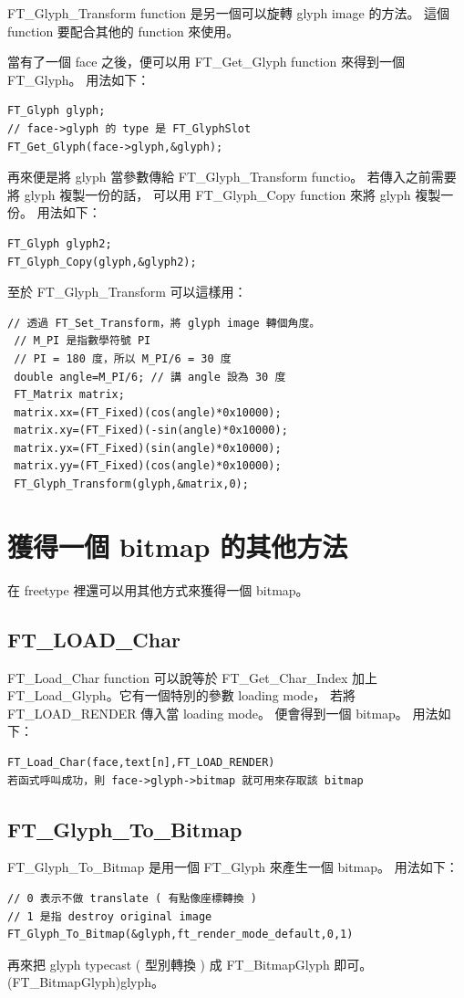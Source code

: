 \documentclass[12pt,a4]{article}
\begin{document}
\begin{CJK}{UTF8}{cwmu}
FT\_{}Glyph\_{}Transform function 是另一個可以旋轉 glyph image 的方法。
這個 function 要配合其他的 function 來使用。

當有了一個 face 之後，便可以用 FT\_{}Get\_{}Glyph function 來得到一個 
FT\_{}Glyph。 用法如下：
\begin{Verbatim}[commandchars=+!?]
FT_Glyph glyph;
// face->glyph 的 type 是 FT_GlyphSlot
FT_Get_Glyph(face->glyph,&glyph);
\end{Verbatim}
再來便是將 glyph 當參數傳給 FT\_{}Glyph\_{}Transform functio。 若傳入之前需要將
glyph 複製一份的話， 可以用 FT\_{}Glyph\_Copy function 來將 glyph 複製一份。
用法如下：
\begin{Verbatim}[commandchars=+!?]
FT_Glyph glyph2;
FT_Glyph_Copy(glyph,&glyph2);
\end{Verbatim}
至於 FT\_{}Glyph\_{}Transform 可以這樣用：
\begin{Verbatim}[commandchars=+!?]
 // 透過 FT_Set_Transform，將 glyph image 轉個角度。
 // M_PI 是指數學符號 PI
 // PI = 180 度，所以 M_PI/6 = 30 度
 double angle=M_PI/6; // 講 angle 設為 30 度
 FT_Matrix matrix;
 matrix.xx=(FT_Fixed)(cos(angle)*0x10000);
 matrix.xy=(FT_Fixed)(-sin(angle)*0x10000);
 matrix.yx=(FT_Fixed)(sin(angle)*0x10000);
 matrix.yy=(FT_Fixed)(cos(angle)*0x10000);
 FT_Glyph_Transform(glyph,&matrix,0);
\end{Verbatim}
\newpage
\section{獲得一個 bitmap 的其他方法}
在 freetype 裡還可以用其他方式來獲得一個 bitmap。
\subsection{FT\_{}LOAD\_{}Char}
FT\_{}Load\_{}Char function 可以說等於 FT\_{}Get\_{}Char\_{}Index 加上 
FT\_{}Load\_{}Glyph。它有一個特別的參數 loading mode，
若將 FT\_{}LOAD\_{}RENDER 傳入當 loading mode。 便會得到一個 bitmap。 用法如下：
\begin{Verbatim}[commandchars=+!?]
FT_Load_Char(face,text[n],FT_LOAD_RENDER)
若函式呼叫成功，則 face->glyph->bitmap 就可用來存取該 bitmap
\end{Verbatim}
\subsection{FT\_{}Glyph\_{}To\_{}Bitmap}
FT\_{}Glyph\_{}To\_{}Bitmap 是用一個 FT\_{}Glyph 來產生一個 bitmap。 用法如下：
\begin{Verbatim}[commandchars=+!?]
// 0 表示不做 translate ( 有點像座標轉換 )
// 1 是指 destroy original image
FT_Glyph_To_Bitmap(&glyph,ft_render_mode_default,0,1)
\end{Verbatim}
再來把 glyph typecast ( 型別轉換 ) 成 FT\_{}BitmapGlyph 即可。
(FT\_{}BitmapGlyph)glyph。




\end{CJK}
\end{document}
